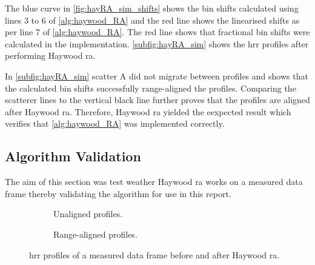\documentclass[class=report,11pt,crop=false]{standalone}
\begin{document}
    
    The blue curve in \autoref{fig:hayRA_sim_shifts} shows the bin shifts calculated using lines 3 to 6 of \autoref{alg:haywood_RA} and the red line shows the linearised shifts as per line 7 of \autoref{alg:haywood_RA}. The red line shows that fractional bin shifts were calculated in the implementation. \autoref{subfig:hayRA_sim} shows the \gls{hrr} profiles after performing Haywood \gls{ra}.

    In \autoref{subfig:hayRA_sim} scatter A did not migrate between profiles and shows that the calculated bin shifts successfully range-aligned the profiles. Comparing the scatterer lines to the vertical black line further proves that the profiles are aligned after Haywood \gls{ra}. Therefore, Haywood \gls{ra} yielded the eexpected result which verifies that \autoref{alg:haywood_RA} was implemented correctly.
    
    \subsection{Algorithm Validation}
    The aim of this section was test weather Haywood \gls{ra} works on a measured data frame thereby validating the algorithm for use in this report.

    \begin{figure}[h]
        \centering
        \begin{subfigure}{0.4\linewidth}
                \centering
                \resizebox{\linewidth}{!}{}
                \caption{Unaligned profiles.\label{subfig:hayRA_measured_hrrp_unaligned}}
        \end{subfigure}
        \begin{subfigure}{0.4\linewidth}
                \centering
                \resizebox{\linewidth}{!}{}
                \caption{Range-aligned profiles.\label{subfig:hayRA_measureed_hrrp}}
        \end{subfigure}
        \caption{\gls{hrr} profiles of a measured data frame before and after Haywood \gls{ra}. \label{fig:hayRA_measured}}
    \end{figure}
\end{document}
